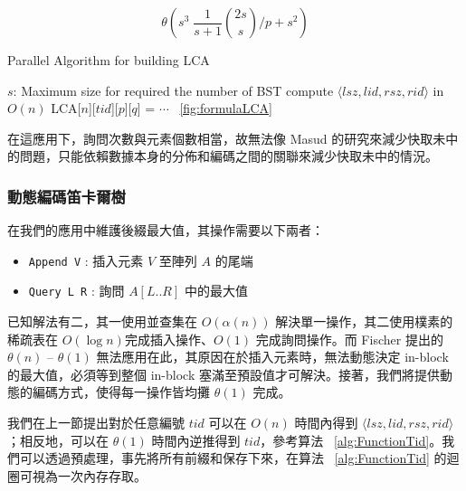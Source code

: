\documentclass{gapd}
\begin{document}
$$\theta\left(s^3 \; \frac{1}{s+1} \binom{2s}{s} \bigg/ p + s^2 \right)$$

\begin{algorithm*}
  \caption{Parallel Algorithm for building LCA}
  \label{alg:parallelLCA}
  \begin{algorithmic}[1]
    \Require
      $s$: Maximum size for required the number of BST
          \State compute $\langle\mathit{lsz},\mathit{lid},\mathit{rsz},\mathit{rid}\rangle$ in $O(n)$
            \State LCA[$n$][$\mathit{tid}$][$p$][$q$] = $\cdots$ ~\ref{fig:formulaLCA}
          \EndFor
        \EndParFor
      \EndParFor
    \EndFor
  \end{algorithmic}
\end{algorithm*}

在這應用下，詢問次數與元素個數相當，故無法像 Masud \cite{masud} 的研究來減少快取未中的問題，只能依賴數據本身的分佈和編碼之間的關聯來減少快取未中的情況。

\subsubsection{動態編碼笛卡爾樹}

在我們的應用中維護後綴最大值，其操作需要以下兩者：

\begin{itemize}
  \item \texttt{Append V} : 插入元素 $V$ 至陣列 $A$ 的尾端
  \item \texttt{Query L R} : 詢問 $A[L .. R]$ 中的最大值
\end{itemize}

已知解法有二，其一使用並查集在 $O(\alpha(n))$ 解決單一操作，其二使用樸素的稀疏表在 $O(\log n)$完成插入操作、$O(1)$ 完成詢問操作。而 Fischer \cite{fischer} 提出的 $\theta(n)$ -- $\theta(1)$ 無法應用在此，其原因在於插入元素時，無法動態決定 in-block 的最大值，必須等到整個 in-block 塞滿至預設值才可解決。接著，我們將提供動態的編碼方式，使得每一操作皆均攤 $\theta(1)$ 完成。

我們在上一節提出對於任意編號 $\mathit{tid}$ 可以在 $O(n)$ 時間內得到 $\langle\mathit{lsz},\mathit{lid},\mathit{rsz},\mathit{rid}\rangle$；相反地，可以在 $\theta(1)$ 時間內逆推得到 $\mathit{tid}$，參考算法 ~\ref{alg:FunctionTid}。我們可以透過預處理，事先將所有前綴和保存下來，在算法 ~\ref{alg:FunctionTid} 的迴圈可視為一次內存存取。
\end{document}
